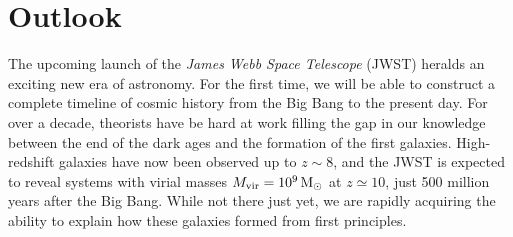 \documentclass[../thesis.tex]{subfiles}
\begin{document}
\chapter{Outlook}
The upcoming launch of the \textit{James Webb Space Telescope} (JWST) heralds an exciting new era of astronomy. 
For the first time, we will be able to construct a complete timeline of cosmic history from the Big Bang to the present day.
For over a decade, theorists have be hard at work filling the gap in our knowledge between the end of the dark ages and the formation of the first galaxies.
High-redshift galaxies have now been observed up to $z\sim8$, and the JWST is expected to reveal systems with virial masses $M_{\mathrm{vir}} = 10^9\,\mathrm{M}_{\odot}$ at $z\simeq10$, just 500 million years after the Big Bang.
While not there just yet, we are rapidly acquiring the ability to explain how these galaxies formed from first principles.
\end{document}
